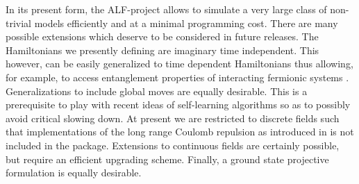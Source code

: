 
In its present form, the  ALF-project  allows to simulate a very large class of non-trivial models efficiently and at a minimal  programming cost.  There are many possible extensions which deserve to be considered in future releases.    The Hamiltonians we presently defining are imaginary time independent. This however, can be easily generalized  to time dependent Hamiltonians thus allowing, for example, to access  entanglement properties of interacting fermionic systems \cite{Broecker14,Assaad14,Assaad13a,Assaad15}. Generalizations to include global moves are equally desirable. This is a prerequisite to  play with recent ideas of self-learning algorithms  \cite{Xu16a} so as to  possibly avoid critical slowing down.  At present we are restricted to discrete fields such that  implementations  of  the long range Coulomb repulsion as introduced in \cite{Hohenadler14,Ulybyshev2013,Brower12} is not included in the package.   Extensions  to  continuous fields are certainly possible, but require an efficient upgrading scheme. Finally,  a ground state projective formulation   is equally desirable.
